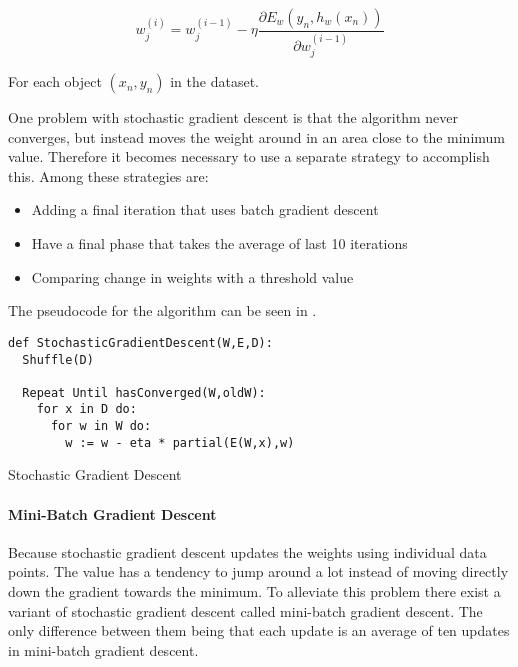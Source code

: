$$ w_j^{(i)} = w_j^{(i-1)} - \eta \frac{\partial E_w(y_n, h_w(x_n))}{\partial w_j^{(i-1)}} $$

For each object $(x_n, y_n)$ in the dataset.

One problem with stochastic gradient descent is that the algorithm never converges, but instead moves the weight around in an area close to the minimum value.
Therefore it becomes necessary to use a separate strategy to accomplish this.
Among these strategies are:
\begin{itemize}
\item Adding a final iteration that uses batch gradient descent 
\item Have a final phase that takes the average of last 10 iterations 
\item Comparing change in weights with a threshold value
\end{itemize}

The pseudocode for the algorithm can be seen in .

\begin{listing}[H]
\begin{verbatim}
def StochasticGradientDescent(W,E,D):
  Shuffle(D)

  Repeat Until hasConverged(W,oldW):
    for x in D do:
      for w in W do: 
        w := w - eta * partial(E(W,x),w)
\end{verbatim}
\caption{Stochastic Gradient Descent}
\label{lst:sgt}
\end{listing}

\paragraph{Mini-Batch Gradient Descent}\label{sec:mini-batch}

Because stochastic gradient descent updates the weights using individual data points.
The value has a tendency to jump around a lot instead of moving directly down the gradient towards the minimum.
To alleviate this problem there exist a variant of stochastic gradient descent called mini-batch gradient descent. 
The only difference between them being that each update is an average of ten updates in mini-batch gradient descent. 







